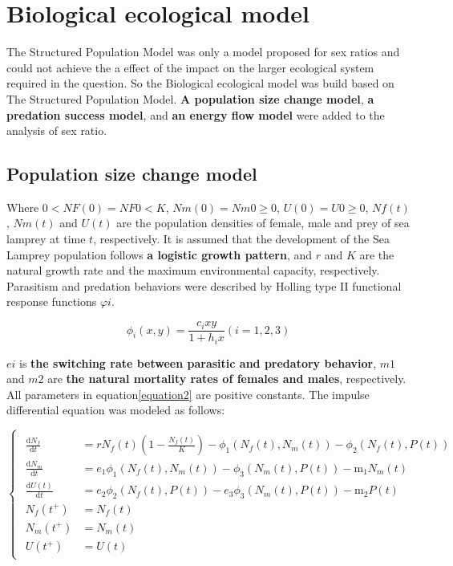 \documentclass{mcmthesis}
\begin{document}
\section{Biological ecological model}
The Structured Population Model was only a model proposed for sex ratios
and could not achieve the a effect of the impact on the larger ecological system required in the question.
So the Biological ecological model was build based on The Structured Population Model.
\textbf{A population size change model}, \textbf{a predation success model}, and \textbf{an energy flow model} were added to the analysis of sex ratio.

\subsection{Population size change model}
Where $0<NF(0)=NF0<K$, $Nm(0)=Nm0≥0$, $U(0)=U0≥0$, $Nf(t)$, $Nm(t)$ and $U(t)$ are the population densities of
female, male and prey of sea lamprey at time $t$, respectively.
It is assumed that the development of the Sea Lamprey population follows \textbf{a logistic growth pattern},
and $r$ and $K$ are the natural growth rate and the maximum environmental capacity, respectively.
Parasitism and predation behaviors were described by Holling type II functional response functions $\varphi i$.

\begin{equation}
  \phi_{i}(x, y)=\frac{c_{i} x y}{1+h_{i} x}(i=1,2,3)
\end{equation}

$ei$ is \textbf{the switching rate between parasitic and predatory behavior},
$m1$ and $m2$ are \textbf{the natural mortality rates of females and males}, respectively.
All parameters in equation\ref{equation2}\cite{10} are positive constants. The impulse differential equation was modeled as follows:

\begin{equation}
  \label{equation2}
  \begin{cases}
    \begin{aligned}
      \frac{\mathrm{d} N_{f}}{\mathrm{d} t} & = r N_{f}(t)\left(1-\frac{N_{f}(t)}{K}\right)-\phi_{1}(N_{f}(t), N_{m}(t))-\phi_{2}(N_{f}(t), P(t)) \\
      \frac{\mathrm{d} N_{m}}{\mathrm{d} t} & = e_{1} \phi_{1}(N_{f}(t), N_{m}(t))-\phi_{3}(N_{m}(t), P(t))-\mathrm{m}_{1}N_{m}(t)                \\
      \frac{\mathrm{d} U(t)}{\mathrm{d} t}  & = e_{2} \phi_{2}(N_{f}(t), P(t))-e_{3} \phi_{3}(N_{m}(t), P(t))-\mathrm{m}_{2} P(t)                 \\
      N_{f} \left(t^{+}\right)              & = N_{f}(t)                                                                                          \\
      N_{m}\left(t^{+}\right)               & = N_{m}(t)                                                                                          \\
      U\left(t^{+}\right)                   & = U(t)
    \end{aligned}
  \end{cases}
\end{equation}
\end{document}

